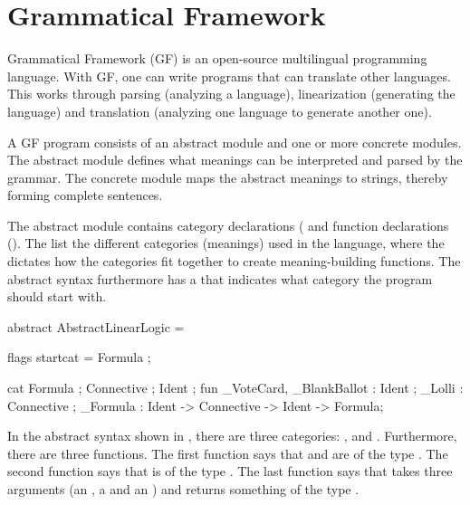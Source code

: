 \section{Grammatical Framework}
\label{GF}


Grammatical Framework (GF) is an open-source multilingual programming language. With GF, one can write programs that can translate other languages. This works through parsing (analyzing a language), linearization (generating the language) and translation (analyzing one language to generate another one).

A GF program consists of an abstract module and one or more concrete modules. The abstract module defines what meanings can be interpreted and parsed by the grammar. The concrete module maps the abstract meanings to strings, thereby forming complete sentences.

The abstract module contains category declarations ( and function declarations (). The  list the different categories (meanings) used in the language, where the  dictates how the categories fit together to create meaning-building functions. The abstract syntax furthermore has a  that indicates what category the program should start with. 

\begin{lstgf}
abstract AbstractLinearLogic = {
    flags startcat = Formula ;
    
    cat 
        Formula ; Connective ; Ident ;
    fun 
        _VoteCard, _BlankBallot : Ident ;
        _Lolli : Connective ;
        _Formula : Ident -> Connective -> Ident -> Formula;
}
\end{lstgf}

In the abstract syntax shown in , there are three categories: ,  and . Furthermore, there are three functions. The first function says that  and  are of the type . The second function says that  is of the type . The last function says that  takes three arguments (an , a  and an ) and returns something of the type .

